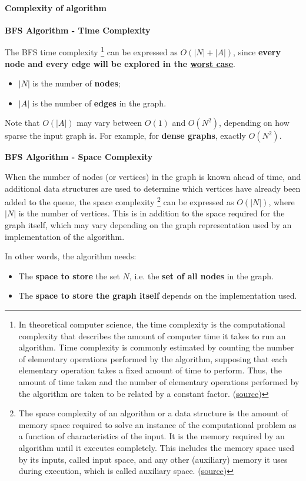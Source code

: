 \paragraph{Complexity of algorithm}

\begin{flushleft}
    \textcolor{Green3}{ \textbf{BFS Algorithm - Time Complexity}}
\end{flushleft}
The BFS time complexity%
\footnote{In theoretical computer science, the time complexity is the computational complexity that describes the amount of computer time it takes to run an algorithm. Time complexity is commonly estimated by counting the number of elementary operations performed by the algorithm, supposing that each elementary operation takes a fixed amount of time to perform. Thus, the amount of time taken and the number of elementary operations performed by the algorithm are taken to be related by a constant factor. (\href{https://en.wikipedia.org/wiki/Time_complexity}{source})}
can be expressed as $O\left(\left|N\right|+\left|A\right|\right)$, since \textbf{every node and every edge will be explored in the \underline{worst case}}.
\begin{itemize}
    \item $\left|N\right|$ is the number of \textbf{nodes};
    \item $\left|A\right|$ is the number of \textbf{edges} in the graph.
\end{itemize}
Note that $O\left(\left|A\right|\right)$ may vary between $O\left(1\right)$ and $O\left(N^{2}\right)$, depending on how sparse the input graph is. For example, for \textbf{dense graphs}, exactly $O\left(N^{2}\right)$.

\highspace
\begin{flushleft}
    \textcolor{Green3}{ \textbf{BFS Algorithm - Space Complexity}}
\end{flushleft}
When the number of nodes (or vertices) in the graph is known ahead of time, and additional data structures are used to determine which vertices have already been added to the queue, the space complexity%
\footnote{The space complexity of an algorithm or a data structure is the amount of memory space required to solve an instance of the computational problem as a function of characteristics of the input. It is the memory required by an algorithm until it executes completely. This includes the memory space used by its inputs, called input space, and any other (auxiliary) memory it uses during execution, which is called auxiliary space. (\href{https://en.wikipedia.org/wiki/Space_complexity}{source})}
can be expressed as $O\left(\left|N\right|\right)$, where $\left|N\right|$ is the number of vertices. This is in addition to the space required for the graph itself, which may vary depending on the graph representation used by an implementation of the algorithm.

\highspace
In other words, the algorithm needs:
\begin{itemize}
    \item The \textbf{space to store} the set $N$, i.e. the \textbf{set of all nodes} in the graph.
    \item The \textbf{space to store the graph itself} depends on the implementation used.
\end{itemize}